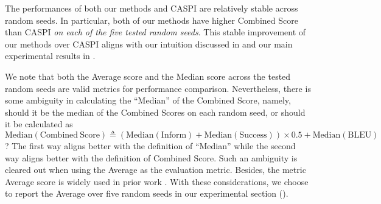 The performances of both our methods and CASPI are relatively stable across random seeds.
In particular, both of our methods have higher Combined Score than CASPI \emph{on each of the five tested random seeds}.
This stable improvement of our methods over CASPI aligns with our intuition discussed in  and our main experimental results in .

We note that both the Average score and the Median score across the tested random seeds are valid metrics for performance comparison.
Nevertheless, there is some ambiguity in calculating the ``Median'' of the Combined Score, namely, should it be the median of the Combined Scores on each random seed, or should it be calculated as $\mathrm{Median}(\mathrm{Combined~Score}) \triangleq (\mathrm{Median}(\mathrm{Inform}) + \mathrm{Median}(\mathrm{Success})) \times 0.5 + \mathrm{Median}(\mathrm{BLEU})$?
The first way aligns better with the definition of ``Median'' while the second way aligns better with the definition of Combined Score.
Such an ambiguity is cleared out when using the Average as the evaluation metric.
Besides, the metric Average score is widely used in prior work \citep[\eg,][]{damd2020,mintl2020,gptcritic2022}.
With these considerations, we choose to report the Average over five random seeds in our experimental section ().

